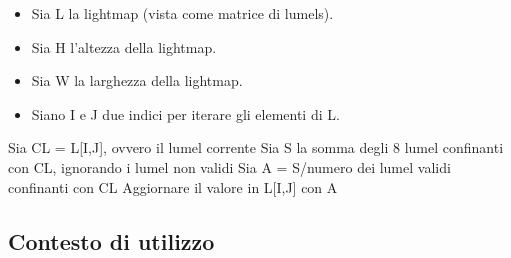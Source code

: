\begin{itemize}
\item Sia L la lightmap (vista come matrice di lumels).
\item Sia H l'altezza della lightmap.
\item Sia W la larghezza della lightmap.
\item Siano I e J due indici per iterare gli elementi di L.
\end{itemize}
 
\begin{algorithm}[H]
  {
   { 
    Sia CL = L[I,J], ovvero il lumel corrente\;
    Sia S la somma degli 8 lumel confinanti con CL, ignorando i lumel non validi\;
    Sia A = S/numero dei lumel validi confinanti con CL\;
    Aggiornare il valore in L[I,J] con A\;
   }
  }
\end{algorithm}

\subsection{Contesto di utilizzo}
\label{sec:chapter_stato_arte_contex_use}


